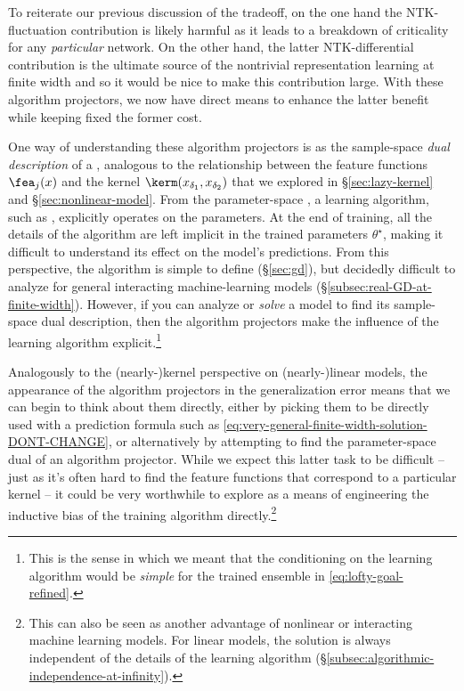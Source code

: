 To reiterate our previous discussion of the tradeoff, on the one hand the NTK-fluctuation contribution is likely harmful as it leads to a breakdown of criticality for any \emph{particular} network.
On the other hand, the latter NTK-differential contribution is the ultimate source of the nontrivial representation learning at finite width and so it would be nice to make this contribution large.
With these algorithm projectors, we now have direct means to enhance the latter benefit while keeping fixed the former cost.



One way of understanding these algorithm projectors is as the sample-space \emph{dual description} of a ,
analogous to the relationship between the feature functions $\fea_j(x)$ and the kernel $\kerm(x_{\delta_1},x_{\delta_2})$ that we explored in \S\ref{sec:lazy-kernel} and \S\ref{sec:nonlinear-model}. 
From the parameter-space , a learning algorithm, such as , explicitly operates on the parameters.  At the end of training, all the details of the algorithm are left implicit in the trained parameters $\theta^\star$, making it difficult to understand its effect on the model's predictions. From this perspective, the algorithm is simple to define  (\S\ref{sec:gd}), but decidedly difficult to analyze for general interacting machine-learning models (\S\ref{subsec:real-GD-at-finite-width}). However, if you can analyze or \emph{solve} a model to find its sample-space dual description,
then the algorithm projectors make the influence of the learning algorithm explicit.\footnote{This is the sense in which we meant that the conditioning on the learning algorithm would be \emph{simple} for the trained ensemble in \eqref{eq:lofty-goal-refined}.}


Analogously to the (nearly-)kernel perspective on (nearly-)linear models, 
the appearance of the algorithm projectors in the generalization error means that we can begin to think about  them directly, either by picking them to be directly used with a prediction formula such as \eqref{eq:very-general-finite-width-solution-DONT-CHANGE}, or alternatively by attempting to find the parameter-space dual of an algorithm projector.
While we expect this latter task to be difficult -- just as it's often hard to find the feature functions that correspond to a particular kernel -- it could be very worthwhile to explore as a means of engineering the inductive bias of the training algorithm directly.\footnote{
    This can also be seen as another advantage of nonlinear or interacting machine learning models. For linear models, the solution is always independent of the details of the learning algorithm (\S\ref{subsec:algorithmic-independence-at-infinity}).
}

